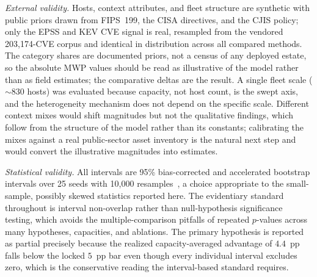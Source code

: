 \emph{External validity.} Hosts, context attributes, and fleet structure are synthetic with
public priors drawn from FIPS~199, the CISA directives, and the CJIS policy; only the EPSS and KEV
CVE signal is real, resampled from the vendored 203{,}174-CVE corpus and identical in distribution
across all compared methods. The category shares are documented priors, not a census of any
deployed estate, so the absolute MWP values should be read as illustrative of the model rather than as
field estimates; the comparative deltas are the result. A single fleet scale ($\sim$830 hosts) was
evaluated because capacity, not host count, is the swept axis, and the heterogeneity mechanism
does not depend on the specific scale. Different context mixes would shift magnitudes but not the
qualitative findings, which follow from the structure of the model rather than its constants;
calibrating the mixes against a real public-sector asset inventory is the natural next step and would
convert the illustrative magnitudes into estimates.

\emph{Statistical validity.} All intervals are 95\% bias-corrected and accelerated bootstrap
intervals over 25 seeds with 10{,}000 resamples~\cite{efron1987bca,efron1994introduction}, a
choice appropriate to the small-sample, possibly skewed statistics reported here. The evidentiary
standard throughout is interval non-overlap rather than null-hypothesis significance testing,
which avoids the multiple-comparison pitfalls of repeated $p$-values across many hypotheses,
capacities, and ablations. The primary hypothesis is reported as partial precisely because the
realized capacity-averaged advantage of $4.4$~pp falls below the locked $5$~pp bar even though
every individual interval excludes zero, which is the conservative reading the interval-based
standard requires.
